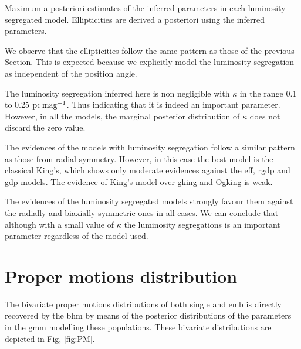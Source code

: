 \begin{table}[ht!]
  \centering
      \caption[]{Maximum-a-posteriori estimates of the inferred parameters in each luminosity segregated model. Ellipticities are derived a posteriori using the inferred parameters.}
         \label{tab:MAPSg}
          \resizebox{\textwidth}{!}{
         
         }
   \end{table}
   
 We observe that the ellipticities follow the same pattern as those of the previous Section. This is expected because we explicitly model the luminosity segregation as independent of the position angle.
   
The luminosity segregation inferred here is non negligible with $\kappa$ in the range 0.1 to 0.25 $\rm{pc}\,\rm{mag}^{-1}$. Thus indicating that it is indeed an important parameter. However, in all the models, the marginal posterior distribution of $\kappa$ does not discard the zero value.

The evidences of the models with luminosity segregation follow a similar pattern as those from radial symmetry. However, in this case the best model is the classical King's, which shows only moderate evidences against the \gls{eff}, \gls{rgdp} and \gls{gdp} models. The evidence of King's model over \gls{gking} and O\gls{gking} is weak.

The evidences of the luminosity segregated models strongly favour them against the radially and biaxially symmetric ones in all cases. We can conclude that although with a small value of $\kappa$ the luminosity segregations is an important parameter regardless of the model used.




\section{Proper motions distribution}
\label{sect:PMresults}
The bivariate proper motions distributions of both single and \gls{emb} is directly recovered by the \gls{bhm} by means of the posterior distributions of the parameters in the \gls{gmm} modelling these populations.
These bivariate distributions are depicted in Fig, \ref{fig:PM}.

